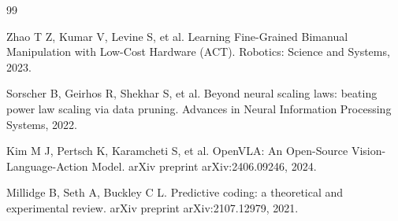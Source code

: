 \documentclass[UTF8,a4paper,12pt]{ctexart}
\begin{document}
\begin{thebibliography}{99}

Zhao T Z, Kumar V, Levine S, et al.
Learning Fine-Grained Bimanual Manipulation with Low-Cost Hardware (ACT).
Robotics: Science and Systems, 2023.

Sorscher B, Geirhos R, Shekhar S, et al.
Beyond neural scaling laws: beating power law scaling via data pruning.
Advances in Neural Information Processing Systems, 2022.

Kim M J, Pertsch K, Karamcheti S, et al.
OpenVLA: An Open-Source Vision-Language-Action Model.
arXiv preprint arXiv:2406.09246, 2024.

Millidge B, Seth A, Buckley C L.
Predictive coding: a theoretical and experimental review.
arXiv preprint arXiv:2107.12979, 2021.

\end{thebibliography}
\end{document}
